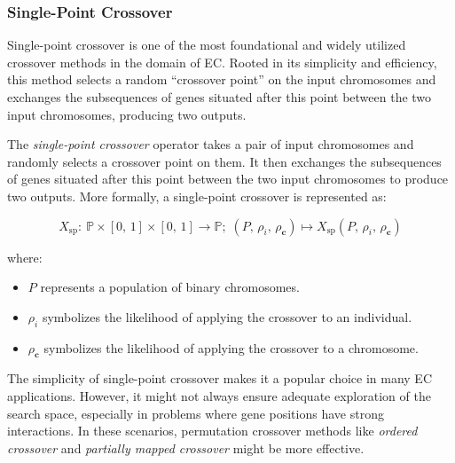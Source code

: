 \subsubsection{Single-Point Crossover}
\label{sec:keen:op:cx:single_point}

  Single-point crossover is one of the most foundational and widely utilized 
  crossover methods in the domain of EC. Rooted in its simplicity and 
  efficiency, this method selects a random \enquote{crossover point} on the 
  input chromosomes and exchanges the subsequences of genes situated after this 
  point between the two input chromosomes, producing two outputs.

  \begin{definition}
    The \textit{single-point crossover} operator takes a pair of input 
    chromosomes and randomly selects a crossover point on them. It then 
    exchanges the subsequences of genes situated after this point between the 
    two input chromosomes to produce two outputs. More formally, a single-point 
    crossover is represented as:

    \begin{equation}
      X_\mathrm{sp} :\: 
        \mathbb{P} \times [0,\, 1] \times [0,\, 1] \rightarrow \mathbb{P};\;
        (P,\, \rho_i,\, \rho_\mathbf{c})
          \mapsto X_\mathrm{sp}(P,\, \rho_i,\, \rho_\mathbf{c})
    \end{equation}

    where:

    \begin{itemize}
      \item \(P\) represents a population of binary chromosomes.
      \item \(\rho_i\) symbolizes the likelihood of applying the crossover to 
        an individual.
      \item \(\rho_\mathbf{c}\) symbolizes the likelihood of applying the 
        crossover to a chromosome.
    \end{itemize}
  \end{definition}

  \begin{remark}
    The simplicity of single-point crossover makes it a popular choice in many 
    EC applications. However, it might not always ensure adequate exploration 
    of the search space, especially in problems where gene positions have 
    strong interactions. In these scenarios, permutation crossover methods like 
    \textit{ordered crossover} and \textit{partially mapped crossover} might be 
    more effective.
  \end{remark}

